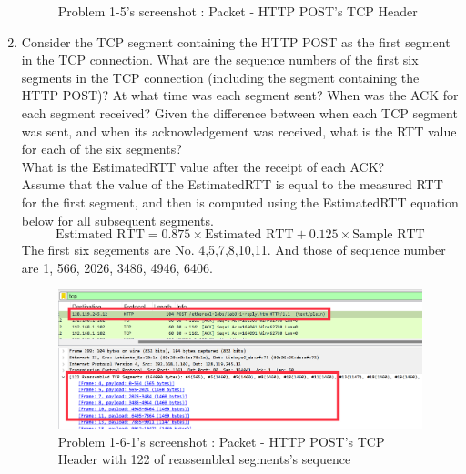 \begin{enumerate}[label=\bfseries Problem \arabic*:,leftmargin=*,labelindent=1em]
\begin{figure}[!h]
    		\caption{\footnotesize Problem 1-5's screenshot : Packet - HTTP POST’s TCP Header}
    		\vspace{-10pt}
        \end{figure}
        \item Consider the TCP segment containing the HTTP POST as the first segment in the TCP connection. What are the sequence numbers of the first six segments in the TCP connection (including the segment containing the HTTP POST)? At what time was each segment sent? When was the ACK for each segment received? Given the difference between when each TCP segment was sent, and when its acknowledgement was received, what is the RTT value for each of the six segments? \\
        What is the EstimatedRTT value after the receipt of each ACK?\\
        Assume that the value of the EstimatedRTT is equal to the measured RTT for the first segment, and then is computed using the EstimatedRTT equation below for all subsequent segments.\\
        \begin{equation*}
            \text{Estimated RTT} = 0.875 \times \text{Estimated RTT} + 0.125 \times \text{Sample RTT}
        \end{equation*}
        \soln
        The first six segements are No. 4,5,7,8,10,11. And those of sequence number are 1, 566, 2026, 3486, 4946, 6406.\\
        \vspace{-4mm}  
        \begin{figure}[!h]\centering
        \hspace{10mm}
    		\includegraphics[width=.75\textwidth]{image/week02/1-6-1.png}
    		\caption{\footnotesize Problem 1-6-1's screenshot : Packet - HTTP POST’s TCP Header with 122 of
    		reassembled segments's sequence}
    		\vspace{-10pt}
        \end{figure}    
        

\end{enumerate}
